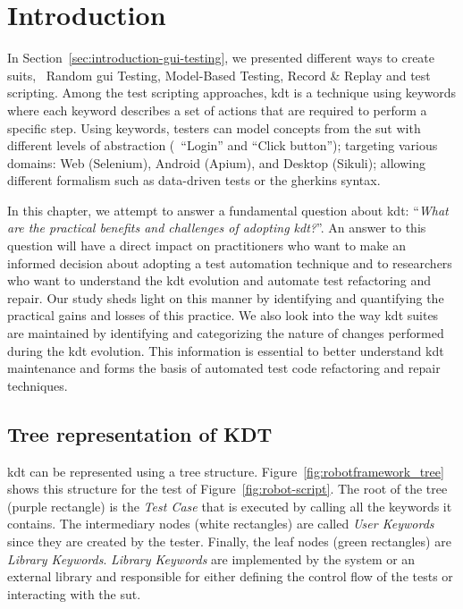 \section{Introduction}
\label{sec:evolution-introduction}

In Section~\ref{sec:introduction-gui-testing}, we presented different ways to create \gls{suit}s, \ie\ Random \gls{gui} Testing, Model-Based Testing, Record \& Replay and test scripting. Among the test scripting approaches, \gls{kdt} is a technique using keywords where each keyword describes a set of actions that are required to perform a specific step. Using keywords, testers can model concepts from the \gls{sut} with different levels of abstraction (\eg\ ``Login'' and ``Click button''); targeting various domains: Web (Selenium), Android (Apium), and Desktop (Sikuli); allowing different formalism such as data-driven tests or the gherkins syntax.

In this chapter, we attempt to answer a fundamental question about \gls{kdt}: ``\emph{What are the practical benefits and challenges of adopting \gls{kdt}?}''.  An answer to this question will have a direct impact on practitioners who want to make an informed decision about adopting a test automation technique and to researchers who want to understand the \gls{kdt} evolution and automate test refactoring and repair. Our study sheds light on this manner by identifying and quantifying the practical gains and losses of this practice. We also look into the way \gls{kdt} suites are maintained by identifying and categorizing the nature of changes performed during the \gls{kdt} evolution. This information is essential to better understand \gls{kdt} maintenance and forms the basis of automated test code refactoring and repair techniques. 


\subsection{Tree representation of KDT}
\label{sec:tree-representation-KDT}

\gls{kdt} can be represented using a tree structure. Figure~\ref{fig:robotframework_tree} shows this structure for the test of Figure~\ref{fig:robot-script}. The root of the tree (purple rectangle) is the \emph{Test Case} that is executed by calling all the keywords it contains. The intermediary nodes (white rectangles) are called \emph{User Keywords} since they are created by the tester. Finally, the leaf nodes (green rectangles) are \emph{Library Keywords}. \emph{Library Keywords} are implemented by the system or an external library and responsible for either defining the control flow of the tests or interacting with the \gls{sut}.

